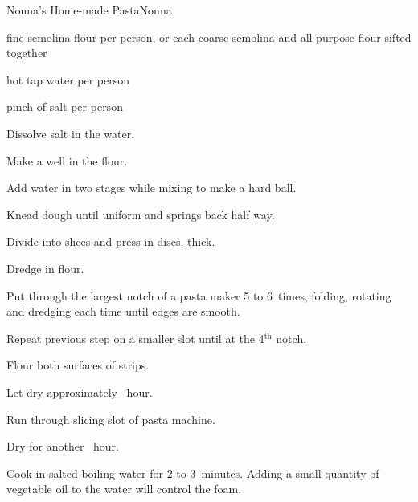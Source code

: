 \begin{recipe}{Nonna's Home-made Pasta}{Nonna}{}

\begin{ingredients}
\item {} fine semolina flour per person, or  each coarse semolina and all-purpose flour sifted together
\item {} hot tap water per person
\item pinch of salt per person
\end{ingredients}

\begin{directions}
\item Dissolve salt in the water.
\item Make a well in the flour.
\item Add water in two stages while mixing to make a hard ball.
\item Knead dough until uniform and springs back half way.
\item Divide into slices and press in  discs, \inch{\threequarter} thick.
\item Dredge in flour.
\item Put through the largest notch of a pasta maker 5 to 6~times, folding, rotating and dredging each time until edges are smooth.
\item Repeat previous step on a smaller slot until at the 4$^{\mathrm{th}}$ notch.
\item Flour both surfaces of strips.
\item Let dry approximately \half~hour.
\item Run through slicing slot of pasta machine.
\item Dry for another \half~hour.
\item Cook in salted boiling water for 2 to 3~minutes. Adding a small quantity of vegetable oil to the water will control the foam.
\end{directions}

\end{recipe}
